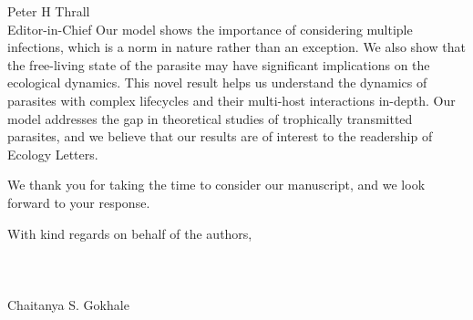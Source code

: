 \documentclass[10,DIN, pagenumber=false, parskip=half,fromalign=right, fromphone=false,fromemail=false, fromurl=false,fromlogo=true, fromrule=false]{scrlttr2}
\begin{document}
\begin{letter}{
\sffamily
\vspace{-0.4cm}
Peter H Thrall\\
Editor-in-Chief
}
Our model shows the importance of considering multiple infections, which is a norm in nature rather than an exception. 
We also show that the free-living state of the parasite may have significant implications on the ecological dynamics.
This novel result helps us understand the dynamics of parasites with complex lifecycles and their multi-host interactions in-depth. 
Our model addresses the gap in theoretical studies of trophically transmitted parasites, and we believe that our results are of interest to the readership of Ecology Letters.

We thank you for taking the time to consider our manuscript, and we look forward to your response.

With kind regards on behalf of the authors,\\
\\
\\
\\
Chaitanya S. Gokhale

\end{letter}
\end{document}
